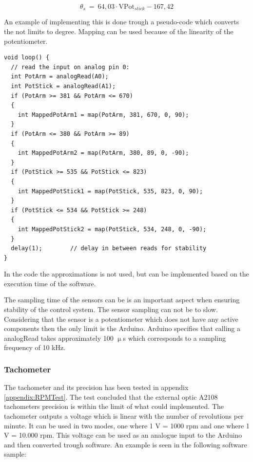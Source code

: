 \begin{equation}
\theta_s\ =\ 64,03 \cdot \text{VPot}_{stick} - 167,42
\end{equation}

\startexplain
\stopexplain

An example of implementing this is done trough a pseudo-code which converts the not limits to degree. Mapping can be used because of the linearity of the potentiometer.
\begin{lstlisting}
void loop() {
  // read the input on analog pin 0:
  int PotArm = analogRead(A0);
  int PotStick = analogRead(A1);
  if (PotArm >= 381 && PotArm <= 670)
  {
    int MappedPotArm1 = map(PotArm, 381, 670, 0, 90);
  }
  if (PotArm <= 380 && PotArm >= 89)
  {
    int MappedPotArm2 = map(PotArm, 380, 89, 0, -90);
  }
  if (PotStick >= 535 && PotStick <= 823)
  {
    int MappedPotStick1 = map(PotStick, 535, 823, 0, 90);
  }
  if (PotStick <= 534 && PotStick >= 248)
  {
    int MappedPotStick2 = map(PotStick, 534, 248, 0, -90);
  }
  delay(1);        // delay in between reads for stability
}
\end{lstlisting}    

In the code the approximations is not used, but can be implemented based on the execution time of the software.

The sampling time of the sensors can be is an important aspect when ensuring stability of the control system. The sensor sampling can not be to slow. Considering that the sensor is a potentiometer which does not have any active components then the only limit is the Arduino. Arduino specifies that calling a analogRead takes approximately 100 $\upmu$s which corresponds to a sampling frequency of 10 kHz. 

\subsubsection*{Tachometer}
The tachometer and its precision has been tested in appendix \ref{appendix:RPMTest}. The test concluded that the external optic A2108 tachometers precision is within the limit of what could implemented. The tachometer outputs a voltage which is linear with the number of revolutions per minute. It can be used in two modes, one where 1 V = 1000 rpm and one where 1 V = 10.000 rpm. This voltage can be used as an analogue input to the Arduino and then converted trough software. An example is seen in the following software sample: 

